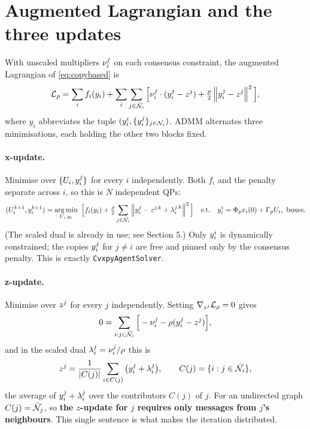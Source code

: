 \documentclass[11pt]{article}
\begin{document}
\section{Augmented Lagrangian and the three updates}

With unscaled multipliers $\nu_{i}^{j}$ on each consensus constraint, the augmented
Lagrangian of \eqref{eq:copybased} is
\begin{equation}
\mathcal{L}_\rho = \sum_i f_i(y_i) + \sum_{i}\sum_{j\in\bar{\mathcal{N}}_i}\Big[
  \nu_{i}^{j}\cdot(y_{i}^{j} - z^{j})
  + \tfrac{\rho}{2}\left\lVert y_{i}^{j} - z^{j} \right\rVert^2 \Big],
\label{eq:auglagmulti}
\end{equation}
where $y_i$ abbreviates the tuple $(y_{i}^{i}, \{y_{i}^{j}\}_{j\in\mathcal{N}_i})$. ADMM
alternates three minimisations, each holding the other two blocks fixed.

\paragraph{x-update.} Minimise over $\{U_i, y_{i}^{j}\}$ for every $i$ independently.
Both $f_i$ and the penalty separate across $i$, so this is $N$ independent QPs:
\begin{equation}
(U_i^{k+1}, y_i^{k+1}) = \argmin_{U_i, y_i}\ \Big[
  f_i(y_i) + \tfrac{\rho}{2}\sum_{j\in\Nbrc_i}\norm{\ycopy{i}{j} - \zconk{j}{k} + \dualk{i}{j}{k}}^2
\Big]
\quad\text{s.t.}\quad \ycopy{i}{i} = \Phi_p x_i(0) + \Gamma_p U_i,\ \text{boxes}.
\label{eq:xupdate}
\end{equation}
(The scaled dual is already in use; see Section 5.) Only $y_{i}^{i}$ is dynamically
constrained; the copies $y_{i}^{j}$ for $j \ne i$ are free and pinned only by the
consensus penalty. This is exactly \texttt{CvxpyAgentSolver}.

\paragraph{z-update.} Minimise over $z^{j}$ for every $j$ independently. Setting
$\nabla_{z^{j}}\mathcal{L}_\rho = 0$ gives
\begin{equation}
0 = \sum_{i : j \in \bar{\mathcal{N}}_i}\Big[ -\nu_{i}^{j} - \rho(y_{i}^{j} - z^{j}) \Big],
\end{equation}
and in the scaled dual $\lambda_{i}^{j} = \nu_{i}^{j}/\rho$ this is
\begin{equation}
z^{j} = \frac{1}{|C(j)|}\sum_{i \in C(j)} \big(y_{i}^{j} + \lambda_{i}^{j}\big),
\qquad C(j) = \{ i : j \in \bar{\mathcal{N}}_i \},
\label{eq:zupdate}
\end{equation}
the average of $y_{i}^{j} + \lambda_{i}^{j}$ over the contributors $C(j)$ of $j$. For an
undirected graph $C(j) = \bar{\mathcal{N}}_j$, so \textbf{the $z$-update for $j$ requires only messages
from $j$'s neighbours}. This single sentence is what makes the iteration distributed.
\end{document}
